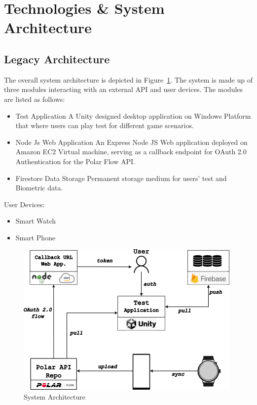 \documentclass{report}
\begin{document}
    \section*{Technologies \& System Architecture}
    \subsection*{Legacy Architecture}

        The overall system architecture is depicted in Figure~\ref{fig:architecture}. The system is made up of three modules 
        interacting with an external API and user devices. The modules are listed as follows:
        \begin{itemize}
            \item{Test Application} A Unity designed desktop application on Windows Platform that where users can play test 
                for different game scenarios.
            \item {Node Js Web Application}
                An Express Node JS Web application deployed on Amazon EC2 Virtual machine, serving as a callback endpoint for 
                OAuth 2.0 Authentication for the Polar Flow API. 
            \item {Firestore Data Storage}
                Permanent storage medium for users' test and Biometric data.
        \end{itemize}
        User Devices:
        \begin{itemize}
            \item{Smart Watch}
            \item {Smart Phone}
        \end{itemize}
        \begin{figure}[h]
        \includegraphics{images/architecture.png}
        \caption{System Architecture}
        \label{fig:architecture}
        \centering
        \end{figure}
\end{document}

